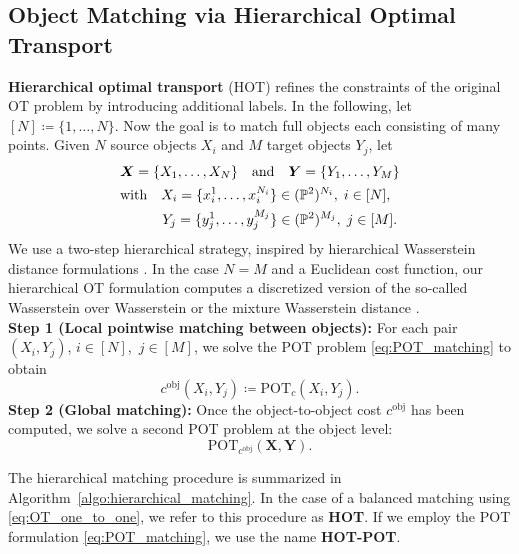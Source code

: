 \documentclass[10pt, twocolumn]{article}
\theoremstyle{definition}
\begin{document}
\subsection{Object Matching via Hierarchical Optimal Transport}
%
\textbf{Hierarchical optimal transport} (HOT) refines the constraints of the original OT problem by introducing additional labels.
In the following, let $[N] \coloneqq \{1,\ldots,N\}$.
Now the goal is  to match full objects each consisting of many points.
Given $N$ source objects $X_i$ and $M$ target objects $Y_j$, let
\begin{align} \label{eq:objects}
&\boldsymbol{X}=\{X_1,\dots,X_N\}
\quad \text{and} \quad
\boldsymbol{Y}=\{Y_1,\dots,Y_M\}
\\
&\text{with} \quad
X_i = \{x_i^1, \dots, x_i^{N_i}\} \in(\mathbb P^2)^{N_i}, \;
i\in [N],
\\
&\hphantom{with} \quad
Y_j = \{y_j^{1}, \dots, y_j^{M_j} \} \in(\mathbb P^2)^{M_j},
\;
j\in [M].
\end{align}
We use a two-step hierarchical strategy, inspired by hierarchical Wasserstein distance formulations \cite{alvarezmelis2020geometricdatasetdistancesoptimal, delon2020wassersteintypedistancespacegaussian, yurochkin2019hierarchical}. 
In the case $N=M$ and a Euclidean cost function, our hierarchical OT formulation computes a discretized version of the so-called Wasserstein over Wasserstein \cite{bonet2025flowing,piening2025slicing_wow} or
the mixture Wasserstein distance \cite{delon2020wassersteintypedistancespacegaussian,piening2025slicing}.
\\[1ex]
\textbf{Step 1 (Local pointwise matching between objects):}
For each pair  $(X_i, Y_j)$, $i\in[N]$,\ $j\in [M]$, we solve the POT problem \eqref{eq:POT_matching} to obtain
\begin{equation} \label{eq:hot_step1}
    c^{\mathrm{obj}}(X_i,Y_j) \coloneqq 
    \mathrm{POT}_c(X_i, Y_j).
\end{equation}
\textbf{Step 2 (Global matching):}
Once the object-to-object cost $c^{\mathrm{obj}}$ has been computed, we solve 
a second POT problem 
at the object level: 
\begin{equation} \label{eq:hot_step2}
    \mathrm{POT}_{c^{\mathrm{obj}} } (\boldsymbol{X}, \boldsymbol{Y}).
\end{equation}

The hierarchical matching procedure is summarized in Algorithm~\ref{algo:hierarchical_matching}. 
In the case of a balanced matching using \eqref{eq:OT_one_to_one}, we refer to this procedure as \textbf{HOT}. If we employ the POT formulation \eqref{eq:POT_matching}, we use the name \textbf{HOT-POT}.
\end{document}
